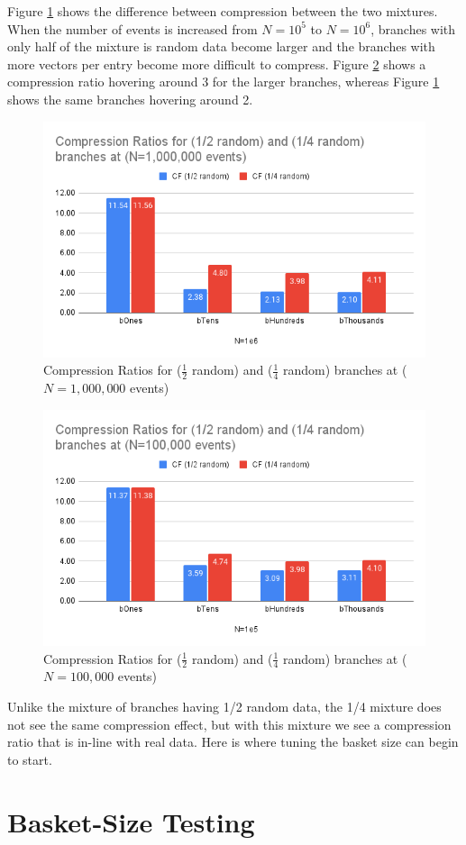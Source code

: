 Figure \ref{fig:toymodel_compF_1e6_mix_random} shows the difference between compression between the two mixtures. 
When the number of events is increased from $N=10^5$ to $N=10^6$, branches with only half of the mixture is random data become larger and the branches with more vectors per entry become more difficult to compress. 
Figure \ref{fig:toymodel_compF_1e5_mix_random} shows a compression ratio hovering around 3 for the larger branches, whereas Figure \ref{fig:toymodel_compF_1e6_mix_random} shows the same branches hovering around 2. 

\begin{figure}[h]
    \caption{Compression Ratios for ($\frac{1}{2}$ random) and ($\frac{1}{4}$ random) branches at ($N=1,000,000$ events)}
    \label{fig:toymodel_compF_1e6_mix_random}
    \centering
    \includegraphics[width=.8\textwidth]{content/toymodel_content/Compression Ratios for (1_2 random) and (1_4 random) branches at (N=1,000,000 events).png}
\end{figure}

\begin{figure}[h]
    \caption{Compression Ratios for ($\frac{1}{2}$ random) and ($\frac{1}{4}$ random) branches at ($N=100,000$ events)}
    \label{fig:toymodel_compF_1e5_mix_random}
    \centering
    \includegraphics[width=.8\textwidth]{content/toymodel_content/Compression Ratios for (1_2 random) and (1_4 random) branches at (N=100,000 events).png}
\end{figure}

Unlike the mixture of branches having 1/2 random data, the 1/4 mixture does not see the same compression effect, but with this mixture we see a compression ratio that is in-line with real data.
Here is where tuning the basket size can begin to start.

\section{Basket-Size Testing}

